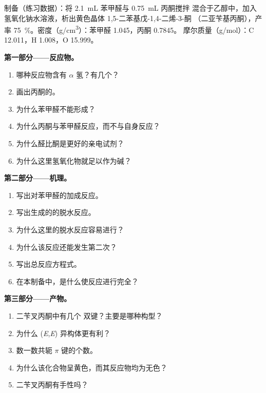 \begin{problem}
\label{pb:b2:enolates-aldol:1}
制备（练习数据）：将 \qty{2.1}{mL} 苯甲醛与 \qty{0.75}{mL} 丙酮搅拌
混合于乙醇中，加入氢氧化钠水溶液，析出黄色晶体 1,5-二苯基戊-1,4-二烯-3-酮
（二亚苄基丙酮），产率 75~\%。密度（\unit{g/cm^3}）：苯甲醛 1.045，丙酮 0.7845。
摩尔质量（\unit{g/mol}）：C 12.011，H 1.008，O 15.999。

\medskip
\noindent\textbf{第一部分——反应物。}
\begin{enumerate}
  \item 哪种反应物含有 $\alpha$ 氢？有几个？
  \item 画出丙酮的。
  \item 为什么苯甲醛不能形成？
  \item 为什么丙酮与苯甲醛反应，而不与自身反应？
  \item 为什么醛比酮是更好的亲电试剂？
  \item 为什么这里氢氧化物就足以作为碱？
\end{enumerate}

\medskip
\noindent\textbf{第二部分——机理。}
\begin{enumerate}[resume]
  \item 写出对苯甲醛的加成反应。
  \item 写出生成的的脱水反应。
  \item 为什么这里的脱水反应容易进行？
  \item 为什么该反应还能发生第二次？
  \item 写出总反应方程式。
  \item 在本制备中，是什么使反应进行完全？
\end{enumerate}

\medskip
\noindent\textbf{第三部分——产物。}
\begin{enumerate}[resume]
  \item 二苄叉丙酮中有几个  双键？主要是哪种构型？
  \item 为什么 (\textit{E},\textit{E}) 异构体更有利？
  \item 数一数共轭 $\pi$ 键的个数。
  \item 为什么该化合物呈黄色，而其反应物均为无色？
  \item 二苄叉丙酮有手性吗？
\end{enumerate}


\end{problem}
